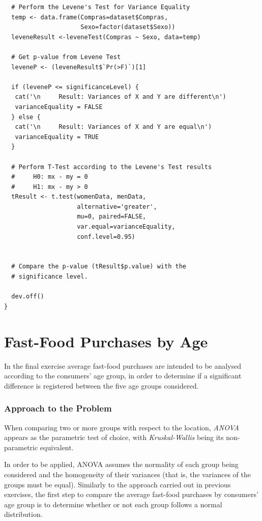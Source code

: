 \documentclass[12pt]{article}
\begin{document}
\begin{lstlisting}
  # Perform the Levene's Test for Variance Equality
  temp <- data.frame(Compras=dataset$Compras,
                     Sexo=factor(dataset$Sexo))
  leveneResult <-leveneTest(Compras ~ Sexo, data=temp)

  # Get p-value from Levene Test
  leveneP <- (leveneResult$`Pr(>F)`)[1]

  if (leveneP <= significanceLevel) {
   cat('\n     Result: Variances of X and Y are different\n')
   varianceEquality = FALSE
  } else {
   cat('\n     Result: Variances of X and Y are equal\n')
   varianceEquality = TRUE
  }

  # Perform T-Test according to the Levene's Test results
  #     H0: mx - my = 0
  #     H1: mx - my > 0
  tResult <- t.test(womenData, menData,
                    alternative='greater',
                    mu=0, paired=FALSE,
                    var.equal=varianceEquality,
                    conf.level=0.95)


  # Compare the p-value (tResult$p.value) with the
  # significance level.
  
  dev.off()
}
\end{lstlisting}

\section{Fast-Food Purchases by Age}
\label{age_tests}

In the final exercise average fast-food purchases are intended to be analysed according to the consumers' age group, in order to determine if a significant difference is registered between the five age groups considered.

\subsubsection{Approach to the Problem}

When comparing two or more groups with respect to the location, \emph{ANOVA} appears as the parametric test of choice, with \emph{Kruskal-Wallis} being its non-parametric equivalent.

In order to be applied, ANOVA assumes the normality of each group being considered and the homogeneity of their variances (that is, the variances of the groups must be equal). Similarly to the approach carried out in previous exercises, the first step to compare the average fast-food purchases by consumers' age group is to determine whether or not each group follows a normal distribution.
\end{document}
